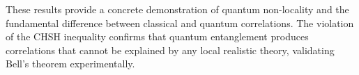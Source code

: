 \documentclass[12pt,a4paper]{article}
\begin{document}
These results provide a concrete demonstration of quantum non-locality and the fundamental difference between classical and quantum correlations. The violation of the CHSH inequality confirms that quantum entanglement produces correlations that cannot be explained by any local realistic theory, validating Bell's theorem experimentally.
\end{document}
